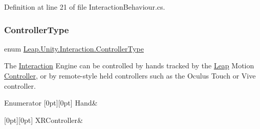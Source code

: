 Definition at line 21 of file Interaction\+Behaviour.\+cs.

\mbox{\label{namespace_leap_1_1_unity_1_1_interaction_a9752eb3e2905e8ebd134fff20c155e6b}} 
\subsubsection{\texorpdfstring{ControllerType}{ControllerType}}
{\footnotesize\ttfamily enum \mbox{\hyperlink{namespace_leap_1_1_unity_1_1_interaction_a9752eb3e2905e8ebd134fff20c155e6b}{Leap.\+Unity.\+Interaction.\+Controller\+Type}}\hspace{0.3cm}{\ttfamily [strong]}}



The \mbox{\hyperlink{namespace_leap_1_1_unity_1_1_interaction}{Interaction}} Engine can be controlled by hands tracked by the \mbox{\hyperlink{namespace_leap_1_1_unity_1_1_leap}{Leap}} Motion \mbox{\hyperlink{class_leap_1_1_controller}{Controller}}, or by remote-\/style held controllers such as the Oculus Touch or Vive controller. 

\begin{DoxyEnumFields}{Enumerator}
[0pt][0pt]{}\mbox{\label{namespace_leap_1_1_unity_1_1_interaction_a9752eb3e2905e8ebd134fff20c155e6baa78b1ac16c0cd02168097fc9a9bd7604}} 
Hand&\\
\hline

[0pt][0pt]{}\mbox{\label{namespace_leap_1_1_unity_1_1_interaction_a9752eb3e2905e8ebd134fff20c155e6ba6ecc9ec5b0bb5f525f4d0e14e8b77382}} 
X\+R\+Controller&\\
\hline

\end{DoxyEnumFields}


